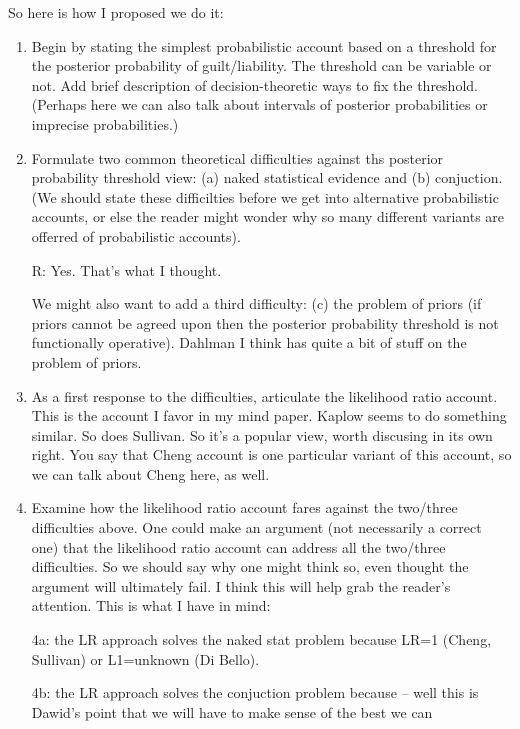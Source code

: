 \documentclass[
  10pt,
  dvipsnames,enabledeprecatedfontcommands]{scrartcl}
\begin{document}
So here is how I proposed we do it:

\begin{enumerate}

\item Begin by stating the simplest probabilistic account based on a threshold for the 
posterior probability of guilt/liability. The threshold can be variable or not. Add brief description of decision-theoretic ways to fix the threshold. (Perhaps here we can also 
talk about intervals of posterior probabilities or imprecise probabilities.) 


\item Formulate two common theoretical difficulties against ths posterior 
probability threshold view: (a) naked statistical evidence and (b) conjuction.
(We should state these difficilties before we get 
into alternative probabilistic accounts, or else the reader might 
wonder why so many different variants are offerred of probabilistic accounts). 

R: Yes. That's what I thought.


We might also want to add a third difficulty: (c) the problem of priors (if priors cannot be agreed 
upon then the posterior probability threshold is not functionally operative). Dahlman I think has quite a bit of stuff on the problem of priors. 

\item  As a first response to the difficulties, articulate the likelihood ratio account. 
This is the account I favor in my mind paper. Kaplow seems to do something similar. So does Sullivan. So it's a  popular view, worth discusing in its own right. You say that Cheng account is one particular variant of this account, so we can talk about Cheng here, as well.

\item Examine how the likelihood ratio account fares against the two/three difficulties above. One could make an argument (not necessarily a correct one) that the likelihood ratio account can address all the two/three difficulties. So we should say why one might think so, even thought the argument will ultimately fail. I think this will help grab the reader's attention. This is what I have in mind:

4a: the LR approach solves the naked stat problem because LR=1 (Cheng, Sullivan) or L1=unknown (Di Bello). 

4b: the LR approach solves the conjuction problem because -- well this is Dawid's point that we will have to make sense of the best we can


\end{enumerate}
\end{document}
